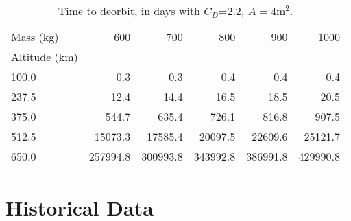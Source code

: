 \documentclass[onecolumn,10pt]{jhwhw}
\begin{document}
\begin{table}[tb]
\begin{center}
\begin{tabular}{lrrrrr}
\toprule
Mass (kg) &           600  &           700  &           800  &           900  &           1000 \\
Altitude (km)     &                &                &                &                &                \\
\midrule
100.0 &       0.3 &       0.3 &       0.4 &       0.4 &       0.4 \\
237.5 &      12.4 &      14.4 &      16.5 &      18.5 &      20.5 \\
375.0 &     544.7 &     635.4 &     726.1 &     816.8 &     907.5 \\
512.5 &   15073.3 &   17585.4 &   20097.5 &   22609.6 &   25121.7 \\
650.0 &  257994.8 &  300993.8 &  343992.8 &  386991.8 &  429990.8 \\
\bottomrule
\end{tabular}
\end{center}
\caption{Time to deorbit, in days with $C_D$=2.2, $A=4$m$^2$.}
\label{altitude_table}
\end{table}



\chapter{Historical Data}

\end{document}
